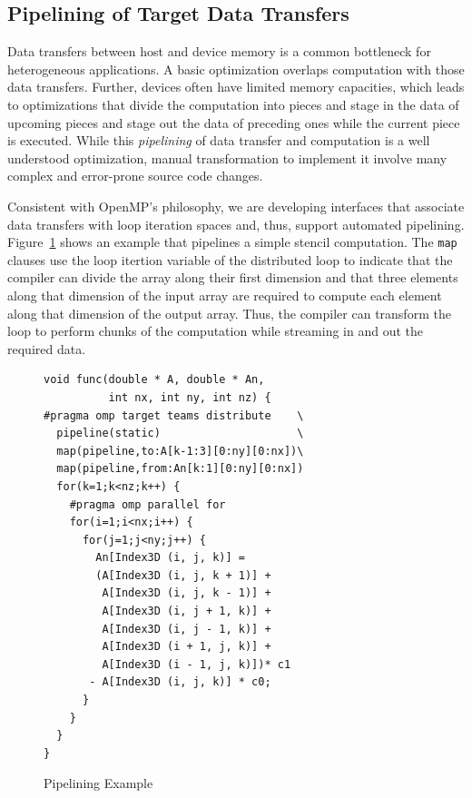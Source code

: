\subsection{Pipelining of Target Data Transfers}
\label{sub:pipelining}

Data transfers between host and device memory is a common bottleneck 
for heterogeneous applications. A basic optimization overlaps computation
with those data transfers. Further, devices often have limited memory 
capacities, which leads to optimizations that divide the computation
into pieces and stage in the data of upcoming pieces and stage out the
data of preceding ones while the current piece is executed. While this
\emph{pipelining} of data transfer and computation is a well understood
optimization, manual transformation to implement it involve many complex
and error-prone source code changes. 

Consistent with OpenMP's philosophy, we are developing interfaces that 
associate data transfers with loop iteration spaces and, thus, support 
automated pipelining. Figure~\ref{fig:pipeline} shows an example that 
pipelines a simple stencil computation. The \texttt{map} clauses use 
the loop itertion variable of the distributed loop to indicate that the
compiler can divide the array along their first dimension and that three
elements along that dimension of the input array are required to compute
each element along that dimension of the output array. Thus, the compiler 
can transform the loop to perform chunks of the computation while streaming
in and out the required data.

\begin{figure}
\begin{verbatim}
void func(double * A, double * An,
          int nx, int ny, int nz) {
#pragma omp target teams distribute    \
  pipeline(static)                     \
  map(pipeline,to:A[k-1:3][0:ny][0:nx])\
  map(pipeline,from:An[k:1][0:ny][0:nx])
  for(k=1;k<nz;k++) {
    #pragma omp parallel for
    for(i=1;i<nx;i++) {
      for(j=1;j<ny;j++) {
        An[Index3D (i, j, k)] =
        (A[Index3D (i, j, k + 1)] +
         A[Index3D (i, j, k - 1)] +
         A[Index3D (i, j + 1, k)] +
         A[Index3D (i, j - 1, k)] +
         A[Index3D (i + 1, j, k)] +
         A[Index3D (i - 1, j, k)])* c1
       - A[Index3D (i, j, k)] * c0;
      }
    } 
  }
}
\end{verbatim}
\caption{Pipelining Example\label{fig:pipeline}}
\end{figure}


